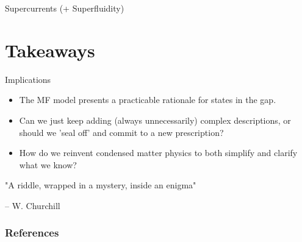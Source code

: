 \documentclass{beamer}
\begin{document}
\begin{frame}{Supercurrents (+ Superfluidity)}
    
\end{frame}



\section{Takeaways}

\begin{frame}{Implications}
    
    \begin{itemize}
        \item The MF model presents a practicable rationale for states in the gap.
        
        \item Can we just keep adding (always unnecessarily) complex descriptions, or should we 'seal off' and commit to a new prescription?
        
        \item How do we reinvent condensed matter physics to both simplify and clarify what we know?
    \end{itemize}
    
\end{frame}




\begin{frame}{}

    \centering "A riddle, wrapped in a mystery, inside an enigma" 
    
    -- W. Churchill
    
\end{frame}




\begin{frame}[allowframebreaks]
        \frametitle{References}
        \printbibliography
\end{frame}


\end{document}
